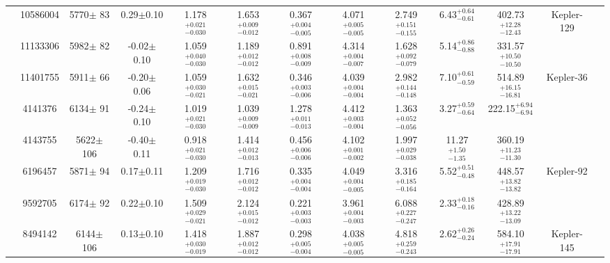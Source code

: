 \begin{table}
\begin{tabular}{ccccccccccccc}
\smallskip
 275 &        10586004 & 5770$\pm$ 83 &  0.29$\pm$0.10 & 1.178$^{+ 0.021}_{-0.030}$& 1.653$^{+ 0.009}_{-0.012}$& 0.367$^{+ 0.004}_{-0.005}$& 4.071$^{+ 0.005}_{-0.005}$&  2.749$^{+ 0.151}_{-0.155}$&  6.43$^{+ 0.64}_{-0.61}$&402.73$^{+ 12.28}_{- 12.43}$ &              Kepler-129 &\citet{Rowe:2014jq}  \\
\smallskip
 276 &        11133306 & 5982$\pm$ 82 & -0.02$\pm$0.10 & 1.059$^{+ 0.040}_{-0.030}$& 1.189$^{+ 0.012}_{-0.012}$& 0.891$^{+ 0.008}_{-0.009}$& 4.314$^{+ 0.004}_{-0.007}$&  1.628$^{+ 0.092}_{-0.079}$&  5.14$^{+ 0.86}_{-0.88}$&331.57$^{+ 10.50}_{- 10.50}$ &                                           &   \\
\smallskip
 277 &        11401755 & 5911$\pm$ 66 & -0.20$\pm$0.06 & 1.059$^{+ 0.030}_{-0.021}$& 1.632$^{+ 0.015}_{-0.021}$& 0.346$^{+ 0.003}_{-0.006}$& 4.039$^{+ 0.004}_{-0.004}$&  2.982$^{+ 0.144}_{-0.148}$&  7.10$^{+ 0.61}_{-0.59}$&514.89$^{+ 16.15}_{- 16.81}$ &             Kepler-36 &\citet{Carter:2012gq}  \\
\smallskip
 280 &         4141376 & 6134$\pm$ 91 & -0.24$\pm$0.10 & 1.019$^{+ 0.021}_{-0.030}$& 1.039$^{+ 0.009}_{-0.009}$& 1.278$^{+ 0.011}_{-0.013}$& 4.412$^{+ 0.003}_{-0.004}$&  1.363$^{+ 0.052}_{-0.056}$&  3.27$^{+ 0.59}_{-0.64}$&222.15$^{+  6.94}_{-  6.94}$ &                                           &   \\
\smallskip
 281 &         4143755 & 5622$\pm$106 & -0.40$\pm$0.11 & 0.918$^{+ 0.021}_{-0.030}$& 1.414$^{+ 0.012}_{-0.013}$& 0.456$^{+ 0.006}_{-0.006}$& 4.102$^{+ 0.001}_{-0.002}$&  1.997$^{+ 0.029}_{-0.038}$& 11.27$^{+ 1.50}_{-1.35}$&360.19$^{+ 11.23}_{- 11.30}$ &                                           &   \\
\smallskip
 285 &         6196457 & 5871$\pm$ 94 &  0.17$\pm$0.11 & 1.209$^{+ 0.019}_{-0.030}$& 1.716$^{+ 0.012}_{-0.012}$& 0.335$^{+ 0.004}_{-0.004}$& 4.049$^{+ 0.004}_{-0.005}$&  3.316$^{+ 0.185}_{-0.164}$&  5.52$^{+ 0.51}_{-0.48}$&448.57$^{+ 13.82}_{- 13.82}$ &                Kepler-92 &\citet{Xie:2014jk}  \\
\smallskip
 288 &         9592705 & 6174$\pm$ 92 &  0.22$\pm$0.10 & 1.509$^{+ 0.029}_{-0.021}$& 2.124$^{+ 0.015}_{-0.012}$& 0.221$^{+ 0.003}_{-0.003}$& 3.961$^{+ 0.004}_{-0.003}$&  6.088$^{+ 0.227}_{-0.247}$&  2.33$^{+ 0.18}_{-0.16}$&428.89$^{+ 13.22}_{- 13.09}$ &                                           &   \\
\smallskip
 370 &         8494142 & 6144$\pm$106 &  0.13$\pm$0.10 & 1.418$^{+ 0.030}_{-0.019}$& 1.887$^{+ 0.012}_{-0.012}$& 0.298$^{+ 0.005}_{-0.004}$& 4.038$^{+ 0.005}_{-0.005}$&  4.818$^{+ 0.259}_{-0.243}$&  2.62$^{+ 0.26}_{-0.24}$&584.10$^{+ 17.91}_{- 17.91}$ &               Kepler-145 &\citet{Xie:2014jk}  \\

\end{tabular}
\end{table}
